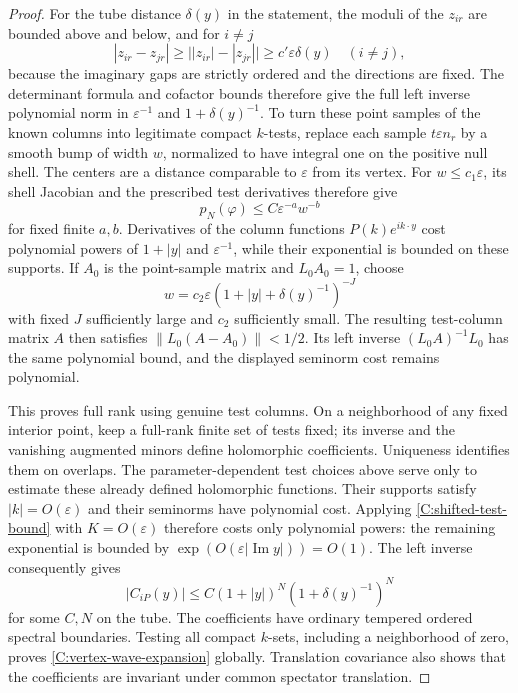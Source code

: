 \begin{proof}
For the tube distance $\delta(y)$ in the statement, the moduli
of the $z_{ir}$ are bounded
above and below, and for $i\ne j$
\[
 |z_{ir}-z_{jr}|\ge\big||z_{ir}|-|z_{jr}|\big|
 \ge c'\varepsilon\delta(y)\quad(i\ne j),
\]
because the imaginary gaps are strictly ordered and the directions
are fixed. The determinant formula and cofactor bounds therefore
give the full left inverse polynomial norm in
$\varepsilon^{-1}$ and $1+\delta(y)^{-1}$. To turn these point
samples of the known columns into legitimate compact $k$-tests,
replace each sample $t\varepsilon n_r$ by a smooth bump of width $w$,
normalized to have integral one on the positive null shell. The centers
are a distance comparable to $\varepsilon$ from its vertex. For
$w\le c_1\varepsilon$, its shell Jacobian and the prescribed test
derivatives therefore give
\[
 p_N(\varphi)\le C\varepsilon^{-a}w^{-b}
\]
for fixed finite $a,b$. Derivatives of the column functions
$P(k)e^{ik\cdot y}$ cost polynomial powers of $1+|y|$ and
$\varepsilon^{-1}$, while their exponential is bounded on these
supports. If $A_0$ is the point-sample matrix and $L_0A_0=1$,
choose
\[
 w=c_2\varepsilon(1+|y|+\delta(y)^{-1})^{-J}
\]
with fixed $J$ sufficiently large and $c_2$ sufficiently small. The
resulting test-column matrix $A$ then satisfies
$\|L_0(A-A_0)\|<1/2$. Its left inverse
$(L_0A)^{-1}L_0$ has the same polynomial bound, and the displayed
seminorm cost remains polynomial.

This proves full rank using genuine test columns. On a neighborhood
of any fixed interior point, keep a full-rank finite set of tests
fixed; its inverse and the vanishing augmented minors define
holomorphic coefficients. Uniqueness identifies them on overlaps.
The parameter-dependent test choices above serve only to estimate
these already defined holomorphic functions. Their supports satisfy
$|k|=O(\varepsilon)$ and their seminorms have polynomial cost.
Applying \eqref{C:shifted-test-bound} with $K=O(\varepsilon)$
therefore costs only polynomial powers: the remaining exponential
is bounded by $\exp(O(\varepsilon|\operatorname{Im}y|))=O(1)$.
The left inverse consequently gives
\begin{equation}\label{C:coefficient-bound}
 |C_{iP}(y)|\le C(1+|y|)^N(1+\delta(y)^{-1})^N
\end{equation}
for some $C,N$ on the tube. The coefficients have ordinary tempered
ordered spectral boundaries. Testing all compact $k$-sets, including
a neighborhood of zero, proves \eqref{C:vertex-wave-expansion}
globally. Translation covariance also shows that the coefficients
are invariant under common spectator translation.

\end{proof}

